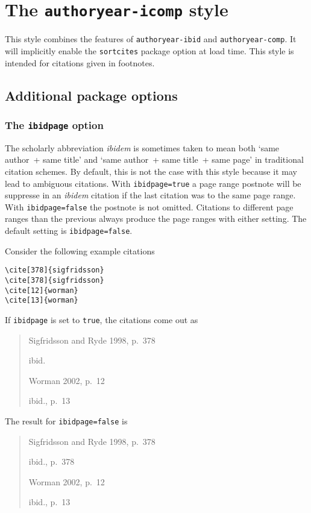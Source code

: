 \documentclass[a4paper]{article}
\begin{document}
\section*{The \texttt{authoryear-icomp} style}

This style combines the features of \texttt{authoryear-ibid} and
\texttt{authoryear-comp}. It will implicitly enable the
\texttt{sortcites} package option at load time. This style is
intended for citations given in footnotes.

\subsection*{Additional package options}

\subsubsection*{The \texttt{ibidpage} option}

The scholarly abbreviation \emph{ibidem} is sometimes taken to mean
both `same author~+ same title' and `same author~+ same title~+ same
page' in traditional citation schemes. By default, this is not the
case with this style because it may lead to ambiguous citations.
With \texttt{ibidpage=true} a page range postnote will be suppresse
in an \emph{ibidem} citation if the last citation was to the same
page range. With \texttt{ibidpage=false} the postnote is not omitted.
Citations to different page ranges than the previous always produce
the page ranges with either setting.
The default setting is \texttt{ibidpage=false}.

Consider the following example citations
\begin{verbatim}
\cite[378]{sigfridsson}
\cite[378]{sigfridsson}
\cite[12]{worman}
\cite[13]{worman}
\end{verbatim}
%
If \texttt{ibidpage} is set to \texttt{true}, the citations
come out as
\begin{quote}
Sigfridsson and Ryde 1998, p.~378

ibid.

Worman 2002, p.~12

ibid., p.~13
\end{quote}
%
The result for \texttt{ibidpage=false} is
\begin{quote}
Sigfridsson and Ryde 1998, p.~378

ibid., p.~378

Worman 2002, p.~12

ibid., p.~13
\end{quote}
\end{document}
